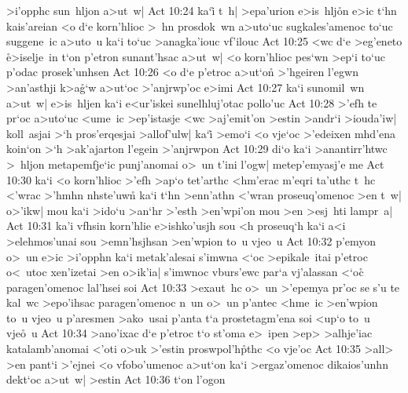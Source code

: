 >i'opphc
sun~hljon
a>ut~w|\bibvsend
\vs Act 10:24
ka`i\r{}
t~h|
>epa'urion
e>is~hlj\r{o}n
e>ic
t`hn
kais'areian
<o
d`e
korn'hlioc
>~hn
prosdok~wn
a>uto`uc
sugkales'amenoc
to`uc
suggene~ic
a>uto~u
ka`i
to`uc
>anagka'iouc
vf'ilouc\bibvsend
\vs Act 10:25
<wc
d`e
>eg'eneto
\r{e}>iselje~in
t`on
p'etron
sunant'hsac
a>ut~w|
<o
korn'hlioc
pes`wn
>ep`i
to`uc
p'odac
prosek'unhsen\bibvsend
\vs Act 10:26
<o
d`e
p'etroc
a>ut`on\r{}
>'hgeiren
l'egwn
>an'asthji
k>a\r{g}`w
a>ut`oc
>'anjrwp'oc
e>imi\bibvsend
\vs Act 10:27
ka`i
sunomil~wn
a>ut~w|
e>is~hljen
ka`i
e<ur'iskei
sunelhluj'otac
pollo'uc\bibvsend
\vs Act 10:28
>'efh
te
pr`oc
a>uto`uc
<ume~ic
>ep'istasje
<wc
>aj'emit'on
>estin
>andr`i
>iouda'iw|
koll~asjai
>`h
pros'erqesjai
>allof'ulw|
ka`i\r{}
>emo`i
<o
vje`oc
>'edeixen
mhd'ena
koin`on
>`h
>ak'ajarton
l'egein
>'anjrwpon\bibvsend
\vs Act 10:29
di`o
ka`i
>anantirr'htwc
>~hljon
metapemfje`ic
punj'anomai
o>~un
t'ini
l'ogw|
metep'emyasj'e
me\bibvsend
\vs Act 10:30
ka`i
<o
korn'hlioc
>'efh
>ap`o
tet'arthc
<hm'erac
m'eqri
ta'uthc
t~hc
<'wrac
>'hmhn
nhste'uwn\r{}
ka`i
t`hn
>enn'athn
<'wran
proseuq'omenoc
>en
t~w|
o>'ikw|
mou
ka`i
>ido`u
>an`hr
>'esth
>en'wpi'on
mou
>en
>esj~hti
lampr~a|\bibvsend
\vs Act 10:31
ka'i
vfhsin
korn'hlie
e>ishko'usjh
sou
<h
proseuq`h
ka`i
a<i
>elehmos'unai
sou
>emn'hsjhsan
>en'wpion
to~u
vjeo~u\bibvsend
\vs Act 10:32
p'emyon
o>~un
e>ic
>i'opphn
ka`i
metak'alesai
s'imwna
<`oc
>epikale~itai
p'etroc
o<~utoc
xen'izetai
>en
o>ik'ia|
s'imwnoc
vburs'ewc
par`a
vj'alassan
<`oc\r{}
paragen'omenoc
lal'hsei
soi\bibvsend
\vs Act 10:33
>exaut~hc
o>~un
>'epemya
pr'oc
se
s'u
te
kal~wc
>epo'ihsac
paragen'omenoc
n~un
o>~un
p'antec
<hme~ic
>en'wpion
to~u
vjeo~u
p'aresmen
>ako~usai
p'anta
t`a
prostetagm'ena
soi
<up`o
to~u
vje\r{o}~u\bibvsend
{}
\vs Act 10:34
>ano'ixac
d`e
p'etroc
t`o
st'oma
e>~ipen
>ep>
>alhje'iac
katalamb'anomai
<'oti
o>uk
>'estin
proswpol'h\r{p}thc
<o
vje'oc\bibvsend
\vs Act 10:35
>all>
>en
pant`i
>'ejnei
<o
vfobo'umenoc
a>ut`on
ka`i
>ergaz'omenoc
dikaios'unhn
dekt`oc
a>ut~w|
>estin\bibvsend
\vs Act 10:36
t`on
l'ogon

